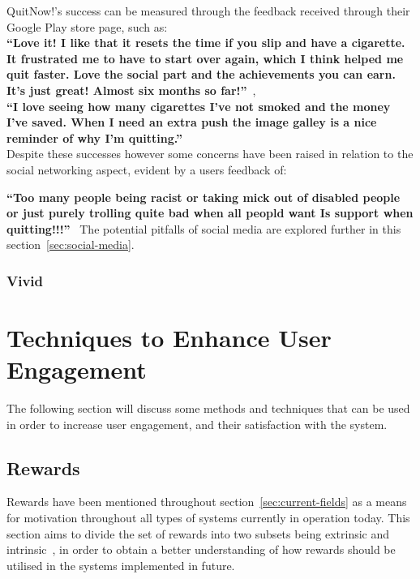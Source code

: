 \documentclass[a4paper,12pt]{article}
\begin{document}
QuitNow!'s success can be measured through the feedback received through their Google Play store page, such as: \\

\indent\textbf{``Love it! I like that it resets the time if you slip and have a cigarette. It frustrated me to have to start over again, which I think helped me quit faster. Love the social part and the achievements you can earn. It's just great! Almost six months so far!''}~\citep{quitnow},\\

\indent\textbf{``I love seeing how many cigarettes I've not smoked and the money I've saved. When I need an extra push the image galley is a nice reminder of why I'm quitting.''}~\citep{quitnow}\\

Despite these successes however some concerns have been raised in relation to the social networking aspect, evident by a users feedback of:\ 

\indent\textbf{``Too many people being racist or taking mick out of disabled people or just purely trolling quite bad when all peopld want Is support when quitting!!!''}~\citep{quitnow}
The potential pitfalls of social media are explored further in this section~\ref{sec:social-media}.

\subsubsection{Vivid}


\newpage
\section{Techniques to Enhance User Engagement}\label{sec:techniques-to-enhance}
The following section will discuss some methods and techniques that can be used in order to increase user engagement, and their satisfaction with the system.

\subsection{Rewards}\label{sec:rewards}
Rewards have been mentioned throughout section~\ref{sec:current-fields} as a means for motivation throughout all types of systems currently in operation today.
This section aims to divide the set of rewards into two subsets being extrinsic and intrinsic~\citep{bread-and-games,fun-of-use,deci_extrinsic_2001,McGonigal:2011:RBW:1972527}, in order to obtain a better understanding of how rewards should be utilised in the systems implemented in future.
\end{document}
